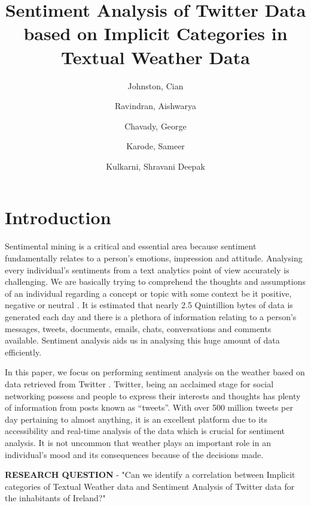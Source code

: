 \documentclass[a4paper,10pt]{article}
\begin{document}
    \title{Sentiment Analysis of Twitter Data based on Implicit Categories in Textual Weather Data}
    \author{
        Johnston, Cian
        \and
        Ravindran, Aishwarya
        \and
        Chavady, George
        \and
        Karode, Sameer
        \and
        Kulkarni, Shravani Deepak
    }

    \maketitle
    \section{Introduction}

    Sentimental mining is a critical and essential area because sentiment fundamentally relates to a person’s emotions, impression and attitude. Analysing every individual’s sentiments from a text analytics point of view accurately is challenging. We are basically trying to comprehend the thoughts and assumptions of an individual regarding a concept or topic with some context be it positive, negative or neutral . It is estimated that nearly 2.5 Quintillion bytes of data is generated each day  and there is a plethora of information relating to a person’s messages, tweets, documents, emails, chats, conversations and comments available. Sentiment analysis aids us in analysing this huge amount of data efficiently.

    In this paper, we focus on performing sentiment analysis on the weather based on data retrieved from Twitter . Twitter, being an acclaimed stage for social networking possess and people to express their interests and thoughts has plenty of information from posts known as “tweets”. With over 500 million tweets per day pertaining to almost anything, it is an excellent platform due to its accessibility and real-time analysis of the data which is crucial for sentiment analysis. It is not uncommon that weather plays an important role in an individual’s mood and its consequences because of the decisions made. \newline
    
    \textbf{RESEARCH QUESTION} - "Can we identify a correlation between Implicit categories of Textual Weather data and Sentiment Analysis of Twitter data for the inhabitants of Ireland?"
    
\end{document}
